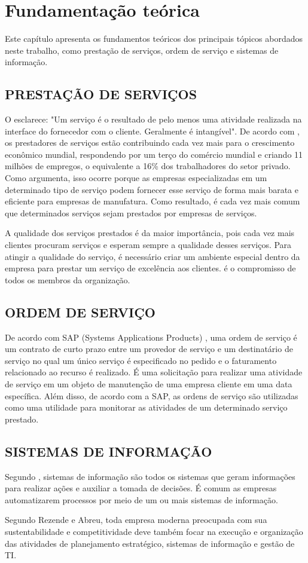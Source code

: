\chapter{Fundamentação teórica}
Este capítulo apresenta os fundamentos teóricos dos principais tópicos abordados neste trabalho, como prestação de serviços, ordem de serviço e sistemas de informação.
\section{PRESTAÇÃO DE SERVIÇOS}
O  esclarece: "Um serviço é o resultado de pelo menos uma atividade realizada na interface do fornecedor com o cliente. Geralmente é intangível".
De acordo com , os prestadores de serviços estão contribuindo cada vez mais para o crescimento econômico mundial, respondendo por um terço do comércio mundial e criando 11 milhões de empregos, o equivalente a 16\% dos trabalhadores do setor privado. Como  argumenta, isso ocorre porque as empresas especializadas em um determinado tipo de serviço podem fornecer esse serviço de forma mais barata e eficiente para empresas de manufatura. Como resultado, é cada vez mais comum que determinados serviços sejam prestados por empresas de serviços.

A qualidade dos serviços prestados é da maior importância, pois cada vez mais clientes procuram serviços e esperam sempre a qualidade desses serviços. Para atingir a qualidade do serviço, é necessário criar um ambiente especial dentro da empresa para prestar um serviço de excelência aos clientes. é o compromisso de todos os membros da organização. \cite{SENAC}

\section{ORDEM DE SERVIÇO}
De acordo com SAP (Systems Applications Products) \cite{douglas_da_silva_2020}, uma ordem de serviço é um contrato de curto prazo entre um provedor de serviço e um destinatário de serviço no qual um único serviço é especificado no pedido e o faturamento relacionado ao recurso é realizado. É uma solicitação para realizar uma atividade de serviço em um objeto de manutenção de uma empresa cliente em uma data específica. Além disso, de acordo com a SAP, as ordens de serviço são utilizadas como uma utilidade para monitorar as atividades de um determinado serviço prestado.

\section{SISTEMAS DE INFORMAÇÃO}
Segundo , sistemas de informação são todos os sistemas que geram informações para realizar ações e auxiliar a tomada de decisões. É comum as empresas automatizarem processos por meio de um ou mais sistemas de informação.

Segundo Rezende e Abreu, toda empresa moderna preocupada com sua sustentabilidade e competitividade deve também focar na execução e organização das atividades de planejamento estratégico, sistemas de informação e gestão de TI.